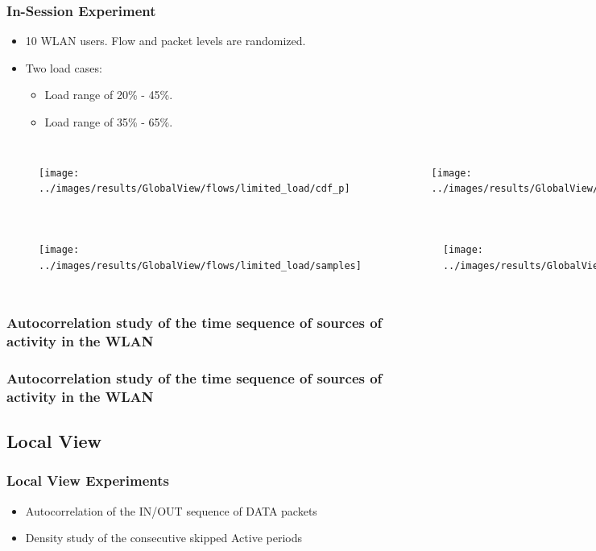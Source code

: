 \documentclass[9pt,handout,serif]{beamer}
\begin{document}
\begin{frame}[c]
	\frametitle{In-Session Experiment}
	\begin{itemize}
		\item 10 WLAN users. Flow and packet levels are randomized.
		\item Two load cases:
		\begin{itemize}
			\item Load range of 20\% - 45\%.
			\item Load range of 35\% - 65\%.
		\end{itemize}
	\end{itemize}
	
	\begin{columns}
		\centering
		\begin{figure}
			\centering
			\texttt{[image: ../images/results/GlobalView/flows/limited\_load/cdf\_p]}
		\end{figure}
		\begin{figure}
			\centering
			\texttt{[image: ../images/results/GlobalView/flows/limited\_load/nflows]}
		\end{figure}
	\end{columns}
	
	\begin{columns}
		\centering
		\column{.5\textwidth}
		\begin{figure}
			\centering
			\texttt{[image: ../images/results/GlobalView/flows/limited\_load/samples]}
		\end{figure}
		\column{.5\textwidth}
		\begin{figure}
			\centering
			\texttt{[image: ../images/results/GlobalView/flows/limited\_load/load]}
		\end{figure}
	\end{columns}
\end{frame}

\subsubsection*{Autocorrelation study of the time sequence of sources of activity in the WLAN}
\begin{frame}[c]
	\frametitle{Autocorrelation study of the time sequence of sources of activity in the WLAN}
\end{frame}

\subsection{Local View}
\begin{frame}[c]
	\frametitle{Local View Experiments}
	\begin{itemize}
		\item Autocorrelation of the IN/OUT sequence of DATA packets
		\item Density study of the consecutive skipped Active periods
	\end{itemize}
\end{frame}
\end{document}
